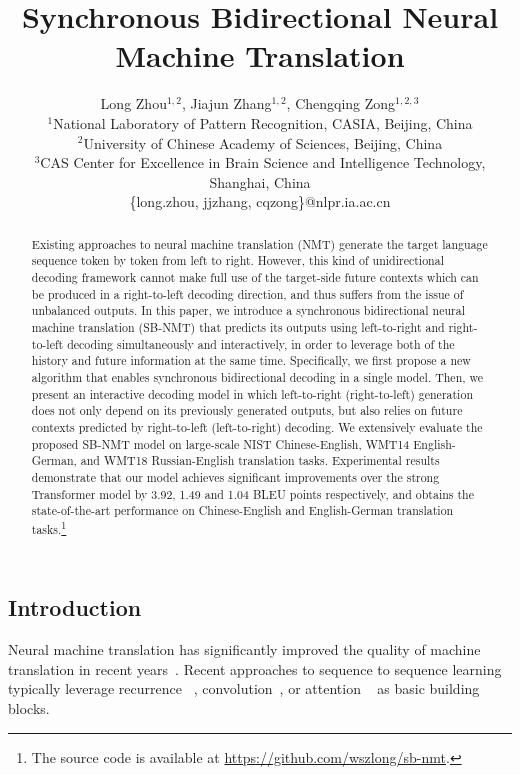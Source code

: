 \documentclass[11pt,a4paper]{article}
\title{Synchronous Bidirectional Neural Machine Translation}
\author{Long Zhou$^{1,2}$, Jiajun Zhang$^{1,2}$\Thanks{Corresponding author.}, Chengqing Zong$^{1,2,3}$\\
	$^1$National Laboratory of Pattern Recognition, CASIA, Beijing, China \\
	$^2$University of Chinese Academy of Sciences, Beijing, China \\
	$^3$CAS Center for Excellence in Brain Science and Intelligence Technology, Shanghai, China \\
	{\sf \{long.zhou, jjzhang, cqzong\}@nlpr.ia.ac.cn }\\
}
\date{}
\begin{document}
\begin{CJK*}{UTF8}{gbsn}


\maketitle

\begin{abstract}
Existing approaches to neural machine translation (NMT) generate the target language sequence token by token from left to right. However, this kind of unidirectional decoding framework cannot make full use of the target-side future contexts which can be produced in a right-to-left decoding direction, and thus suffers from the issue of unbalanced outputs.
In this paper, we introduce a synchronous bidirectional neural machine translation (SB-NMT) that predicts its outputs using left-to-right and right-to-left decoding simultaneously and interactively, in order to leverage both of the history and future information at the same time.
Specifically, we first propose a new algorithm that enables synchronous bidirectional decoding in a single model. Then, we present an interactive decoding model in which left-to-right (right-to-left) generation does not only depend on its previously generated outputs, but also relies on future contexts predicted by right-to-left (left-to-right) decoding.
We extensively evaluate the proposed SB-NMT model on large-scale NIST Chinese-English, WMT14 English-German, and WMT18 Russian-English translation tasks.
Experimental results demonstrate that our model achieves significant improvements over the strong Transformer model by 3.92, 1.49 and 1.04 BLEU points respectively, and obtains the state-of-the-art performance on Chinese-English and English-German translation tasks.{\footnote[1]{The source code is available at \url{https://github.com/wszlong/sb-nmt}.}}
\end{abstract}

\section{Introduction}

Neural machine translation has significantly improved the quality of machine translation in recent years~\cite{Sutskever:2014,Bahdanau:2015,Zhang:2015,Wu:2016, gehring2017convolutional,vaswani2017attention}.
Recent approaches to sequence to sequence learning typically leverage recurrence ~\cite{Sutskever:2014}, convolution~\cite{gehring2017convolutional}, or attention ~\cite{vaswani2017attention} as basic building blocks.



\end{CJK*}
\end{document}
